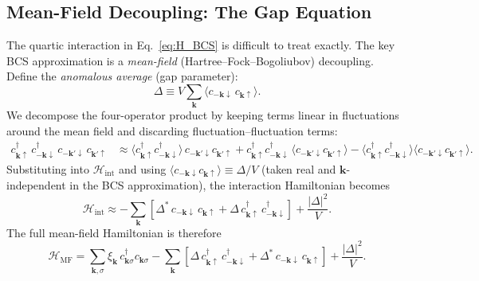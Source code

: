 \subsection{Mean-Field Decoupling: The Gap Equation}

The quartic interaction in Eq.~\eqref{eq:H_BCS} is difficult to treat exactly.
The key BCS approximation is a \emph{mean-field} (Hartree--Fock--Bogoliubov)
decoupling. Define the \emph{anomalous average} (gap parameter):
\begin{equation}
	\Delta \equiv V \sum_{\mathbf{k}} \langle c_{-\mathbf{k}\downarrow}\,
	c_{\mathbf{k}\uparrow}\rangle.
	\label{eq:gap_def}
\end{equation}
We decompose the four-operator product by keeping terms linear in fluctuations
around the mean field and discarding fluctuation--fluctuation terms:
\begin{align}
	c^\dagger_{\mathbf{k}\uparrow}\, c^\dagger_{-\mathbf{k}\downarrow}\,
	c_{-\mathbf{k}'\downarrow}\, c_{\mathbf{k}'\uparrow}
	&\approx
	\langle c^\dagger_{\mathbf{k}\uparrow} c^\dagger_{-\mathbf{k}\downarrow}\rangle\,
	c_{-\mathbf{k}'\downarrow} c_{\mathbf{k}'\uparrow}
	+ c^\dagger_{\mathbf{k}\uparrow} c^\dagger_{-\mathbf{k}\downarrow}\,
	\langle c_{-\mathbf{k}'\downarrow} c_{\mathbf{k}'\uparrow}\rangle
	- \langle c^\dagger_{\mathbf{k}\uparrow} c^\dagger_{-\mathbf{k}\downarrow}\rangle
	\langle c_{-\mathbf{k}'\downarrow} c_{\mathbf{k}'\uparrow}\rangle.
\end{align}
Substituting into $\mathcal{H}_{\mathrm{int}}$ and using
$\langle c_{-\mathbf{k}\downarrow} c_{\mathbf{k}\uparrow}\rangle \equiv
\Delta/V$ (taken real and $\mathbf{k}$-independent in the BCS approximation),
the interaction Hamiltonian becomes
\begin{equation}
	\mathcal{H}_{\mathrm{int}} \approx -\sum_{\mathbf{k}}
	\left[
	\Delta^*\, c_{-\mathbf{k}\downarrow}\, c_{\mathbf{k}\uparrow}
	+ \Delta\, c^\dagger_{\mathbf{k}\uparrow}\, c^\dagger_{-\mathbf{k}\downarrow}
	\right] + \frac{|\Delta|^2}{V}.
\end{equation}
The full mean-field Hamiltonian is therefore
\begin{equation}
	\mathcal{H}_{\mathrm{MF}} = \sum_{\mathbf{k},\sigma}
	\xi_{\mathbf{k}}\, c^\dagger_{\mathbf{k}\sigma} c_{\mathbf{k}\sigma}
	- \sum_{\mathbf{k}}\left[
	\Delta\, c^\dagger_{\mathbf{k}\uparrow}\, c^\dagger_{-\mathbf{k}\downarrow}
	+ \Delta^*\, c_{-\mathbf{k}\downarrow}\, c_{\mathbf{k}\uparrow}
	\right] + \frac{|\Delta|^2}{V}.
	\label{eq:HMF}
\end{equation}

